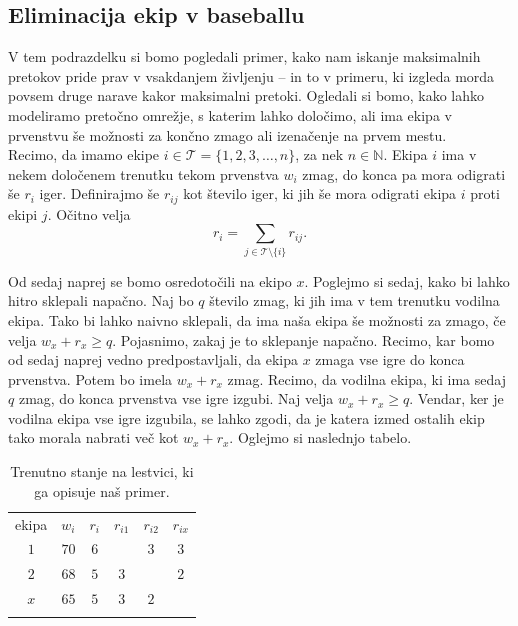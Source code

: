 \documentclass[mat1]{fmfdelo}
\newcommand{\N}{\mathbb N}
\begin{document}

\subsection{Eliminacija ekip v baseballu}

V tem podrazdelku si bomo pogledali primer, kako nam iskanje maksimalnih pretokov pride prav v vsakdanjem življenju -- in to v primeru, ki izgleda morda povsem druge narave kakor maksimalni pretoki. Ogledali si bomo, kako lahko modeliramo pretočno omrežje, s katerim lahko določimo, ali ima ekipa v prvenstvu še možnosti za končno zmago ali izenačenje na prvem mestu.\\

Recimo, da imamo ekipe $i \in \mathcal{T} = \{ 1, 2, 3, \dotsc, n\}$, za nek $n \in \N$. Ekipa $i$ ima v nekem določenem trenutku tekom prvenstva $w_i$ zmag, do konca pa mora odigrati še $r_i$ iger. Definirajmo še $r_{ij}$ kot število iger, ki jih še mora odigrati ekipa $i$ proti ekipi $j$. Očitno velja \[r_i = \sum_{j \in \mathcal{T}\setminus\{i\}} r_{ij}.\]

Od sedaj naprej se bomo osredotočili na ekipo $x$. Poglejmo si sedaj, kako bi lahko hitro sklepali napačno. Naj bo $q$ število zmag, ki jih ima v tem trenutku vodilna ekipa. Tako bi lahko naivno sklepali, da ima naša ekipa še možnosti za zmago, če velja $w_x + r_x \geq q$. Pojasnimo, zakaj je to sklepanje napačno. Recimo, kar bomo od sedaj naprej vedno predpostavljali, da ekipa $x$ zmaga vse igre do konca prvenstva. Potem bo imela $w_x + r_x$ zmag. Recimo, da vodilna ekipa, ki ima sedaj $q$ zmag, do konca prvenstva vse igre izgubi. Naj velja $w_x + r_x \geq q$. Vendar, ker je vodilna ekipa vse igre izgubila, se lahko zgodi, da je katera izmed ostalih ekip tako morala nabrati več kot $w_x + r_x$. Oglejmo si naslednjo tabelo.

\begin{table}[H]
\centering
\caption{Trenutno stanje na lestvici, ki ga opisuje naš primer.}\vspace{3mm}
\begin{tabular}{||c||c|c||c|c|c||}
\hhline{|t:======:t|}
ekipa & $w_i$ & $r_i$ & $r_{i1}$ & $r_{i2}$ & $r_{ix}$\\ \hhline{||=||==||===||}
$1$ & $70$ & $6$ & & $3$ & $3$\\ \hhline{||-||--||---||}
$2$ & $68$ & $5$ & $3$ & & $2$\\ \hhline{||-||--||---||}
$x$ & $65$ & $5$ & $3$ & $2$ & \\ \hhline{|b:======:b|}
\end{tabular}
\end{table}
\end{document}
